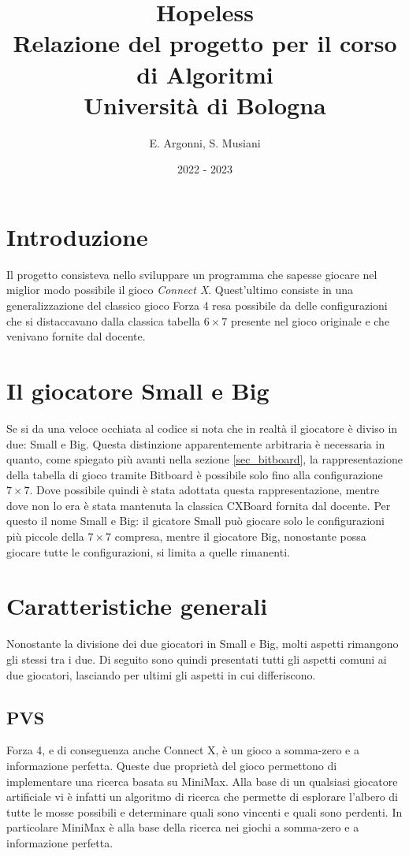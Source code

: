\documentclass[a4paper]{article}
\title{\textbf{Hopeless}\\
\vspace{0.2cm}\normalsize Relazione del progetto per il corso di Algoritmi\\
\normalsize Università di Bologna}
\author{
  E. Argonni,
  S. Musiani
}
\date{2022 - 2023}
\begin{document}
\maketitle
%
%

\section{Introduzione}

Il progetto consisteva nello sviluppare un programma che sapesse giocare nel 
miglior modo possibile il gioco \emph{Connect X}. Quest'ultimo consiste in una
generalizzazione del classico gioco Forza 4 resa possibile da delle 
configurazioni che si distaccavano dalla classica tabella $6 \times 7$ presente 
nel gioco originale e che venivano fornite dal docente.

\section{Il giocatore Small e Big}

Se si da una veloce occhiata al codice si nota che in realtà il giocatore è 
diviso in due: Small e Big. Questa distinzione apparentemente arbitraria è 
necessaria in quanto, come spiegato più avanti nella sezione \ref{sec_bitboard},
la rappresentazione della tabella di gioco tramite Bitboard è possibile solo 
fino alla configurazione $7 \times 7$. Dove possibile quindi è stata adottata 
questa rappresentazione, mentre dove non lo era è stata mantenuta la classica
CXBoard fornita dal docente. Per questo il nome Small e Big: il gicatore Small 
può giocare solo le configurazioni più piccole della $7 \times 7$ compresa, 
mentre il giocatore Big, nonostante possa giocare tutte le configurazioni, si 
limita a quelle rimanenti.

\section{Caratteristiche generali}

Nonostante la divisione dei due giocatori in Small e Big, molti aspetti 
rimangono gli stessi tra i due. Di seguito sono quindi presentati tutti gli 
aspetti comuni ai due giocatori, lasciando per ultimi gli aspetti in cui 
differiscono.

\subsection{PVS}
Forza 4, e di conseguenza anche Connect X, è un gioco a somma-zero e a
informazione perfetta. Queste due proprietà del gioco permettono di implementare
una ricerca basata su MiniMax. Alla base di un qualsiasi giocatore artificiale
vi è infatti un algoritmo di ricerca che permette di esplorare l'albero di tutte
le mosse possibili e determinare quali sono vincenti e quali sono perdenti. In
particolare MiniMax è alla base della ricerca nei giochi a somma-zero e a
informazione perfetta.
\end{document}

